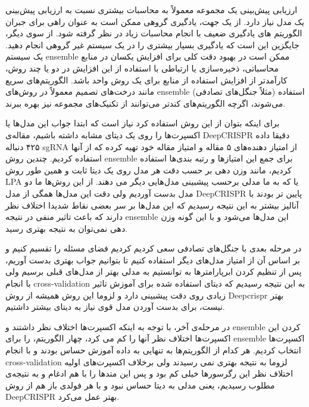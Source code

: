 \documentclass[12pt,a4paper,BCOR=.7cm,headsepline,bibliography=totoc]{report}
\begin{document}
ارزیابی پیش‌بینی یک مجموعه معمولاً به محاسبات بیشتری نسبت به ارزیابی پیش‌بینی یک مدل نیاز دارد. از یک جهت، یادگیری گروهی ممکن است به عنوان راهی برای جبران الگوریتم های یادگیری ضعیف با انجام محاسبات زیاد در نظر گرفته شود. از سوی دیگر، جایگزین این است که یادگیری بسیار بیشتری را در یک سیستم غیر گروهی انجام دهید. یک سیستم ensemble ممکن است در بهبود دقت کلی برای افزایش یکسان در منابع محاسباتی، ذخیره‌سازی یا ارتباطی با استفاده از این افزایش در دو یا چند روش، کارآمدتر از افزایش استفاده از منابع برای یک روش واحد باشد. الگوریتم‌های سریع مانند درخت‌های تصمیم معمولاً در روش‌های ensemble (مثلاً جنگل‌های تصادفی) استفاده می‌شوند، اگرچه الگوریتم‌های کندتر می‌توانند از تکنیک‌های مجموعه نیز بهره ببرند.

برای اینکه بتوان از این روش‌ استفاده کرد نیاز است که ابتدا جواب این مدل‌ها یا اکسپرت‌ها را روی یک دیتای مشابه داشته باشیم، مقاله‌ی DeepCRISPR دقیقا داده ۴۲۵ دنباله sgRNA از امتیاز دهنده‌های ۵ مقاله و امتیاز مقاله خود تهیه کرده که از آنها استفاده کردیم. چندین روش ensemble برای جمع این امتیاز‌ها و رتبه بندی‌ها استفاده کردیم، مانند وزن دهی بر حسب دقت هر مدل روی یک دیتا ثابت و همین طور روش‌ LPA یا  که به ما مدلی برحسب پیشبینی مدل‌هایی دیگر می دهند. از این روش‌ها ما دو مدل بدست آوردیم ولی دقت این مدل‌ها همگی از مدل DeepCRISPR پایین تر بودند با آنالیز بیشتر به این نتیجه رسیدیم که این مدل‌ها بر سر بعضی نقاط شدیدا اختلاف نظر دارند که باعث تاثیر منفی در نتیجه ensemble این مدل‌ها می‌شود و با این گونه وزن دهی نمی‌توان به نتیجه بهتری رسید.

در مرحله بعدی با جنگل‌های تصادفی سعی کردیم کردیم فضای مسئله را تقسیم کنیم و بر اساس آن از امتیاز مدل‌های دیگر استفاده کنیم تا بتوانیم جواب بهتری بدست آوریم، پس از تنظیم کردن ابرپارامترها به توانستیم به مدلی بهتر از مدل‌های قبلی برسیم ولی با انجام cross-validation به این نتیجه رسیدیم که دیتای استفاده شده برای آموزش تاثیر زیادی روی دقت پیشبینی دارد و لزوما این روش همیشه از روش Deepcrispr بهتر نیست، برای بدست آوردن مدل قوی نیاز به دیتای بیشتر داشتیم.

در مرحله‌ی آخر، با توجه به اینکه اکسپرت‌ها اختلاف نظر داشتند و ensemble کردن این اکسپرت‌ها اختلاف نظر آنها را کم می کرد،‌ چهار الگوریتم، 
را برای ensemble اکسپرت‌ها انتخاب کردیم. هر کدام از الگوریتم‌ها به تنهایی به داده آموزش حساس بودند و با انجام cross-validation لزوما به نتیجه بهتری نمی رسیدند ولی برخلاف اکسپرت‌‌های اولیه اختلاف نظر این رگرسورها خیلی کم بود و پس این متد‌ها را با هم ادغام و به نتیجه‌ی مطلوب رسیدیم، یعنی مدلی به دیتا حساس نبود و با هر فولدی باز‌ هم از روش DeepCRISPR بهتر عمل می‌کرد. 
\end{document}
